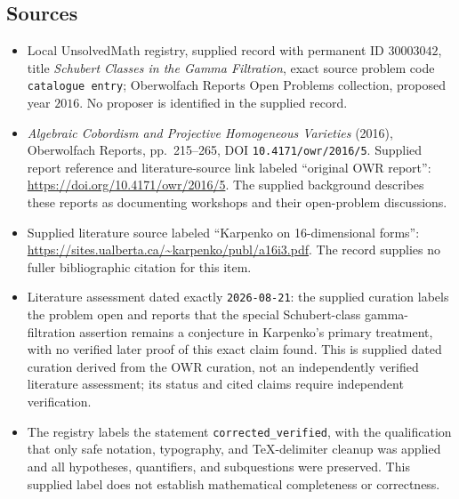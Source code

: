 \documentclass[11pt]{article}
\begin{document}
\subsection{Sources}
\begin{itemize}
\item Local UnsolvedMath registry, supplied record with permanent ID \(30003042\), title \emph{Schubert Classes in the Gamma Filtration}, exact source problem code \texttt{catalogue entry}; Oberwolfach Reports Open Problems collection, proposed year \(2016\). No proposer is identified in the supplied record.
\item \emph{Algebraic Cobordism and Projective Homogeneous Varieties} (2016), Oberwolfach Reports, pp.~215--265, DOI \texttt{10.4171/owr/2016/5}. Supplied report reference and literature-source link labeled ``original OWR report'': \url{https://doi.org/10.4171/owr/2016/5}. The supplied background describes these reports as documenting workshops and their open-problem discussions.
\item Supplied literature source labeled ``Karpenko on 16-dimensional forms'': \url{https://sites.ualberta.ca/~karpenko/publ/a16i3.pdf}. The record supplies no fuller bibliographic citation for this item.
\item Literature assessment dated exactly \texttt{2026-08-21}: the supplied curation labels the problem open and reports that the special Schubert-class gamma-filtration assertion remains a conjecture in Karpenko's primary treatment, with no verified later proof of this exact claim found. This is supplied dated curation derived from the OWR curation, not an independently verified literature assessment; its status and cited claims require independent verification.
\item The registry labels the statement \texttt{corrected\_verified}, with the qualification that only safe notation, typography, and TeX-delimiter cleanup was applied and all hypotheses, quantifiers, and subquestions were preserved. This supplied label does not establish mathematical completeness or correctness.
\end{itemize}
\end{document}
